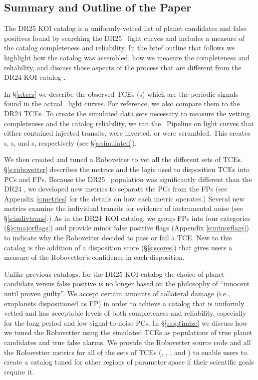 \subsection{Summary and Outline of the Paper}

The DR25 KOI catalog is a uniformly-vetted list of planet candidates and false positives found by searching the DR25 \Kepler\ light curves and includes a measure of the catalog completeness and reliability. In the brief outline that follows we highlight how the catalog was assembled, how we measure the completeness and reliability, and discuss those aspects of the process that are different from the DR24 KOI catalog \citep{Coughlin2016}.

In \S\ref{s:tces} we describe the observed TCEs (\opstce s) which are the periodic signals found in the actual \Kepler\ light curves. For reference, we also compare them to the DR24 TCEs. To create the simulated data sets necessary to measure the vetting completeness and the catalog reliability, we ran the \Kepler\ Pipeline on light curves that either contained injected transits, were inverted, or were scrambled. This creates \injtce s, \invtce s, and \scrtce s, respectively (see \S\ref{s:simulated}).  

We then created and tuned a Robovetter to vet all the different sets of TCEs. \S\ref{s:robovetter} describes the metrics and the logic used to disposition TCEs into PCs and FPs.  Because the DR25 \opstce\ population was significantly different than the DR24 , we developed new metrics to separate the PCs from the FPs (see Appendix \ref{s:metrics} for the details on how each metric operates.) Several new metrics examine the individual transits for evidence of instrumental noise (see \S\ref{s:indivtrans}.) As in the DR24~KOI catalog, we group FPs into four categories (\S\ref{s:majorflags}) and provide minor false positive flags (Appendix \ref{s:minorflags}) to indicate why the Robovetter decided to pass or fail a TCE.  New to this catalog is the addition of a disposition score (\S\ref{s:scores}) that gives users a measure of the Robovetter's confidence in each disposition. 


Unlike previous catalogs, for the DR25 KOI catalog the choice of planet candidate versus false positive is no longer based on the philosophy of ``innocent until proven guilty''. We accept certain amounts of collateral damage (i.e., exoplanets dispositioned as FP) in order to achieve a catalog that is uniformly vetted and has acceptable levels of both completeness and reliability, especially for the long period and low signal-to-noise PCs. In \S\ref{s:optimize} we discuss how we tuned the Robovetter using the simulated TCEs as populations of true planet candidates and true false alarms. We provide the Robovetter source code and all the Robovetter metrics for all of the sets of TCEs (\opstces, \injtces, \invtces, and \scrtces) to enable users to create a catalog tuned for other regions of parameter space if their scientific goals require it. 

